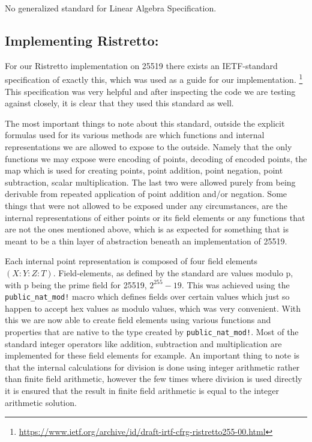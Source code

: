 \documentclass{article}
\begin{document}
No generalized standard for Linear Algebra Specification.

\subsection{Implementing Ristretto:} \label{implementing-ristretto}

For our Ristretto implementation on 25519 there
exists an IETF-standard specification of exactly
this, which was used as a guide for our implementation.
\footnote{\url{https://www.ietf.org/archive/id/draft-irtf-cfrg-ristretto255-00.html}}
This specification was very helpful and after inspecting the code we
are testing against closely, it is clear that they used this standard
as well.

The most important things to note about this standard, outside the
explicit formulas used for its various methods are which functions and
internal representations we are allowed to expose to the outside. Namely
that the only functions we may expose were encoding of points, decoding
of encoded points, the map which is used for creating points, point
addition, point negation, point subtraction, scalar multiplication. The
last two were allowed purely from being derivable from repeated
application of point addition and/or negation. Some things that were not
allowed to be exposed under any circumstances, are the internal
representations of either points or its field elements or any functions
that are not the ones mentioned above, which is as expected for something
that is meant to be a thin layer of abstraction beneath an implementation
of 25519.

Each internal point representation is composed of four field elements
$(X : Y : Z :T)$. Field-elements, as defined by the standard are values
modulo p, with p being the prime field for 25519, $2^{255} - 19$. This
was achieved using the \texttt{public\_nat\_mod!} macro which defines
fields over certain values which just so happen to accept hex values as
modulo values, which was very convenient. With this we are now able to
create field elements using various functions and properties that are
native to the type created by \texttt{public\_nat\_mod!}. Most of the
standard integer operators like addition, subtraction and multiplication
are implemented for these field elements for example. An important thing
to note is that the internal calculations for division is done using
integer arithmetic rather than finite field arithmetic, however the
few times where division is used directly it is ensured that the result
in finite field arithmetic is equal to the integer arithmetic solution.
\end{document}
